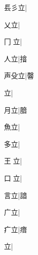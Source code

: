 \begin{multicols}{2}
{{\cjk{}镸彡立}\mktsJzrVerticalBar{}{\cjk{}{\cnsym{}　}{\cnsym{}　}{\cnsym{}　}}|{}\par
{乂立}\mktsJzrVerticalBar{}{\cjk{}{\cnsym{}　}{\cnsym{}　}{\cnsym{}　}}|{}\par
{\cjk{}冂{\cnjzr{}}立}\mktsJzrVerticalBar{}{\cjk{}{\cnsym{}　}{\cnsym{}　}{\cnsym{}　}}|{}\par
{人立}\mktsJzrVerticalBar{}{\cjk{}{\cnsym{}　}{\cnsym{}　}{\cnsym{}　}}|{\cjk{}摿}\par
{\cjk{}声殳立}\mktsJzrVerticalBar{}{\cjk{}{\cnsym{}　}{\cnsym{}　}{\cnsym{}　}}|{\cjk{}韾}\par
{立}\mktsJzrVerticalBar{}{\cjk{}{\cnsym{}　}{\cnsym{}　}{\cnsym{}　}}|{}\par
{\cjk{}{\cnsym{}　}月立}\mktsJzrVerticalBar{}{\cjk{}{\cnsym{}　}{\cnsym{}　}{\cnsym{}　}}|{\cjk{}腤}\par
{\cjk{}{\cnsym{}　}魚立}\mktsJzrVerticalBar{}{\cjk{}{\cnsym{}　}{\cnsym{}　}{\cnsym{}　}}|{}\par
{\cjk{}{\cnsym{}　}多立}\mktsJzrVerticalBar{}{\cjk{}{\cnsym{}　}{\cnsym{}　}{\cnsym{}　}}|{}\par
{\cjk{}王{\cnjzr{}}立}\mktsJzrVerticalBar{}{\cjk{}{\cnsym{}　}{\cnsym{}　}{\cnsym{}　}}|{}\par
{\cjk{}口{\cnjzr{}}立}\mktsJzrVerticalBar{}{\cjk{}{\cnsym{}　}{\cnsym{}　}{\cnsym{}　}}|{}\par
{\cjk{}{\cnsym{}　}言立}\mktsJzrVerticalBar{}{\cjk{}{\cnsym{}　}{\cnsym{}　}{\cnsym{}　}}|{\cjk{}諳}\par
{\cjk{}{\cnsym{}　}广立}\mktsJzrVerticalBar{}{\cjk{}{\cnsym{}　}{\cnsym{}　}{\cnsym{}　}}|{}\par
{\cjk{}{\cnsym{}　}疒立}\mktsJzrVerticalBar{}{\cjk{}{\cnsym{}　}{\cnsym{}　}{\cnsym{}　}}|{\cjk{}瘖}\par
{立}\mktsJzrVerticalBar{}{\cjk{}{\cnsym{}　}{\cnsym{}　}{\cnsym{}　}}|{}\par
}
\end{multicols}
